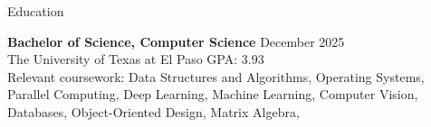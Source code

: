 \documentclass{resume} %
\begin{document}
\introduction[
    fullname=Ashkan Arabi,
    phone=(915) 888 - 9801,
    email=aarabimian@miners.utep.edu,
    linkedin=/in/ashkan-arabi,
    github=github.com/AshkanArabim,
]


\begin{workSection}{Education}

	\textbf{Bachelor of Science, Computer Science} \hfill {December 2025} \\
	The University of Texas at El Paso \hfill GPA: 3.93 \\
	Relevant coursework: 
		Data Structures and Algorithms{,} %
		Operating Systems{,}
		Parallel Computing{,} 
		Deep Learning{,} 
		Machine Learning{,} 
		Computer Vision{,} 
		Databases{,}
		Object-Oriented Design{,} 
		Matrix Algebra{,}
\end{workSection}
\end{document}
